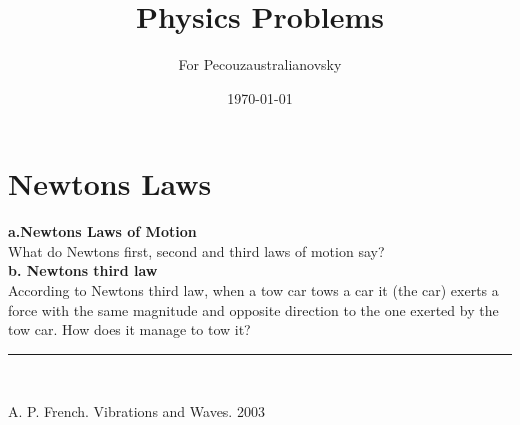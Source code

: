 \documentclass{article}
\begin{document}
\title{Physics Problems} %



\author{ For Pecouzaustralianovsky} %

\date{\today}
\maketitle











\section{Newtons Laws}

\textbf{a.Newtons Laws of Motion}\\

What do Newtons first, second and third laws of motion say?\\

\textbf{b. Newtons third law }\\

According to Newtons third law, when a tow car tows a car it (the car) exerts a force with the same magnitude and opposite direction to the one exerted by the tow car. How does it manage to tow it?

\vspace{2mm}

\begin{center}
         \noindent\rule{8cm}{0.4pt}\\

\end{center}

\noindent [1] A. P. French. Vibrations and Waves. 2003
\end{document}
